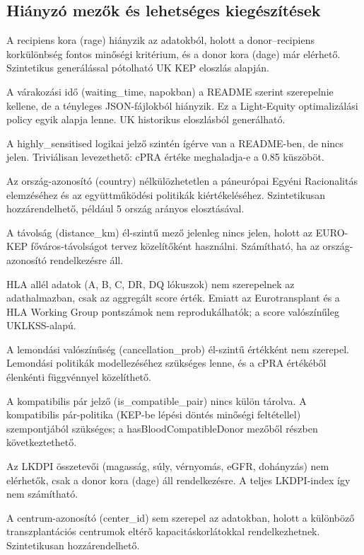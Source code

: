\documentclass[12pt,a4paper]{article}
\begin{document}
\subsection{Hiányzó mezők és lehetséges kiegészítések}

A recipiens kora (rage) hiányzik az adatokból, holott a donor--recipiens korkülönbség fontos minőségi kritérium, és a donor kora (dage) már elérhető. Szintetikus generálással pótolható UK KEP eloszlás alapján.

A várakozási idő (waiting\_time, napokban) a README szerint szerepelnie kellene, de a tényleges JSON-fájlokból hiányzik. Ez a Light-Equity optimalizálási policy egyik alapja lenne. UK historikus eloszlásból generálható.

A highly\_sensitised logikai jelző szintén ígérve van a README-ben, de nincs jelen. Triviálisan levezethető: cPRA értéke meghaladja-e a 0.85 küszöböt.

Az ország-azonosító (country) nélkülözhetetlen a páneurópai Egyéni Racionalitás elemzéséhez és az együttműködési politikák kiértékeléséhez. Szintetikusan hozzárendelhető, például 5 ország arányos elosztásával.

A távolság (distance\_km) él-szintű mező jelenleg nincs jelen, holott az EURO-KEP főváros-távolságot tervez közelítőként használni. Számítható, ha az ország-azonosító rendelkezésre áll.

HLA allél adatok (A, B, C, DR, DQ lókuszok) nem szerepelnek az adathalmazban, csak az aggregált score érték. Emiatt az Eurotransplant és a HLA Working Group pontszámok nem reprodukálhatók; a score valószínűleg UKLKSS-alapú.

A lemondási valószínűség (cancellation\_prob) él-szintű értékként nem szerepel. Lemondási politikák modellezéséhez szükséges lenne, és a cPRA értékéből élenkénti függvénnyel közelíthető.

A kompatibilis pár jelző (is\_compatible\_pair) nincs külön tárolva. A kompatibilis pár-politika (KEP-be lépési döntés minőségi feltétellel) szempontjából szükséges; a hasBloodCompatibleDonor mezőből részben következtethető.

Az LKDPI összetevői (magasság, súly, vérnyomás, eGFR, dohányzás) nem elérhetők, csak a donor kora (dage) áll rendelkezésre. A teljes LKDPI-index így nem számítható.

A centrum-azonosító (center\_id) sem szerepel az adatokban, holott a különböző transzplantációs centrumok eltérő kapacitáskorlátokkal rendelkezhetnek. Szintetikusan hozzárendelhető.
\end{document}
